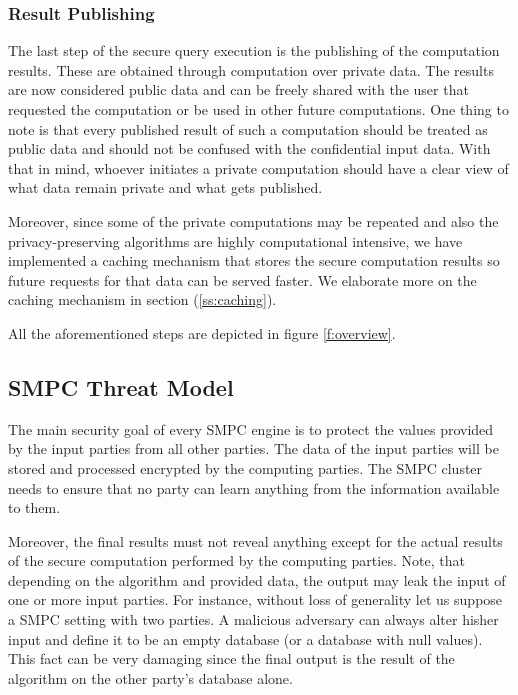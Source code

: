 \subsubsection{Result Publishing}\label{sss:result-publishing}
The last step of the secure query execution is the publishing of the computation results.
These are obtained through computation over private data.
The results are now considered public data and can be freely shared with the user that requested the computation or be used in other future computations.
One thing to note is that every published result of such a computation should be treated as public data and should not be confused with the confidential input data.
With that in mind, whoever initiates a private computation should have a clear view of what data remain private and what gets published.

Moreover, since some of the private computations may be repeated and also the privacy\hyp preserving algorithms are highly computational intensive, we have implemented a caching mechanism that stores the secure computation results so future requests for that data can be served faster.
We elaborate more on the caching mechanism in section (\ref{ss:caching}).


All the aforementioned steps are depicted in figure \ref{f:overview}.




\subsection{SMPC Threat Model}\label{s:smpc-threat-model}
The main security goal of every SMPC engine is to protect the values provided by the input parties from all other parties.
The data of the input parties will be stored and processed encrypted by the computing parties.
The SMPC cluster needs to ensure that no party can learn anything from the information available to them.

Moreover, the final results must not reveal anything except for the actual results of the secure computation performed by the computing parties.
Note, that depending on the algorithm and provided data, the output may leak the input of one or more input parties.
For instance, without loss of generality let us suppose a SMPC setting with two parties.
A malicious adversary can always alter his\myslash her input and define it to be an empty database (or a database with null values).
This fact can be very damaging since the final output is the result of the algorithm on the other party’s database alone.


